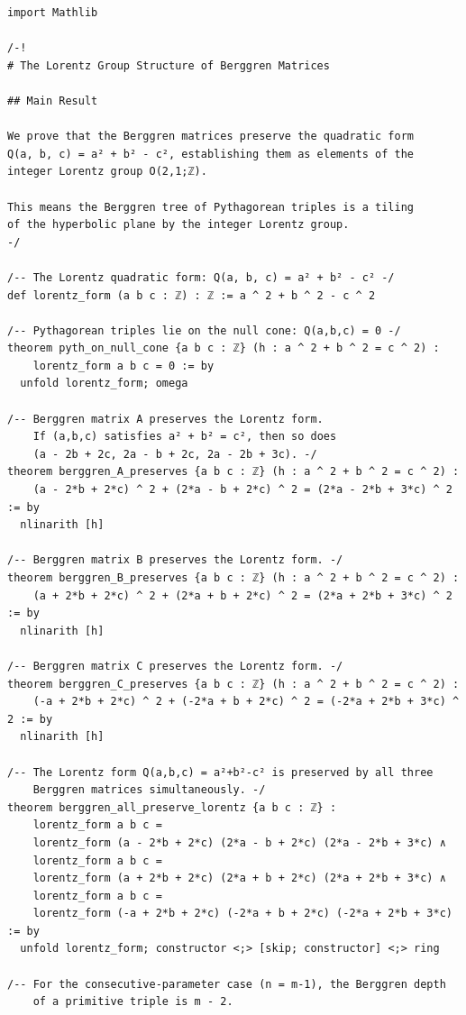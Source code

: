\documentclass[11pt,openany]{book}
\theoremstyle{definition}
\theoremstyle{plain}
\theoremstyle{remark}
\begin{document}
\begin{lstlisting}[style=lean]
import Mathlib

/-!
# The Lorentz Group Structure of Berggren Matrices

## Main Result

We prove that the Berggren matrices preserve the quadratic form
Q(a, b, c) = a² + b² - c², establishing them as elements of the
integer Lorentz group O(2,1;ℤ).

This means the Berggren tree of Pythagorean triples is a tiling
of the hyperbolic plane by the integer Lorentz group.
-/

/-- The Lorentz quadratic form: Q(a, b, c) = a² + b² - c² -/
def lorentz_form (a b c : ℤ) : ℤ := a ^ 2 + b ^ 2 - c ^ 2

/-- Pythagorean triples lie on the null cone: Q(a,b,c) = 0 -/
theorem pyth_on_null_cone {a b c : ℤ} (h : a ^ 2 + b ^ 2 = c ^ 2) :
    lorentz_form a b c = 0 := by
  unfold lorentz_form; omega

/-- Berggren matrix A preserves the Lorentz form.
    If (a,b,c) satisfies a² + b² = c², then so does
    (a - 2b + 2c, 2a - b + 2c, 2a - 2b + 3c). -/
theorem berggren_A_preserves {a b c : ℤ} (h : a ^ 2 + b ^ 2 = c ^ 2) :
    (a - 2*b + 2*c) ^ 2 + (2*a - b + 2*c) ^ 2 = (2*a - 2*b + 3*c) ^ 2 := by
  nlinarith [h]

/-- Berggren matrix B preserves the Lorentz form. -/
theorem berggren_B_preserves {a b c : ℤ} (h : a ^ 2 + b ^ 2 = c ^ 2) :
    (a + 2*b + 2*c) ^ 2 + (2*a + b + 2*c) ^ 2 = (2*a + 2*b + 3*c) ^ 2 := by
  nlinarith [h]

/-- Berggren matrix C preserves the Lorentz form. -/
theorem berggren_C_preserves {a b c : ℤ} (h : a ^ 2 + b ^ 2 = c ^ 2) :
    (-a + 2*b + 2*c) ^ 2 + (-2*a + b + 2*c) ^ 2 = (-2*a + 2*b + 3*c) ^ 2 := by
  nlinarith [h]

/-- The Lorentz form Q(a,b,c) = a²+b²-c² is preserved by all three
    Berggren matrices simultaneously. -/
theorem berggren_all_preserve_lorentz {a b c : ℤ} :
    lorentz_form a b c =
    lorentz_form (a - 2*b + 2*c) (2*a - b + 2*c) (2*a - 2*b + 3*c) ∧
    lorentz_form a b c =
    lorentz_form (a + 2*b + 2*c) (2*a + b + 2*c) (2*a + 2*b + 3*c) ∧
    lorentz_form a b c =
    lorentz_form (-a + 2*b + 2*c) (-2*a + b + 2*c) (-2*a + 2*b + 3*c) := by
  unfold lorentz_form; constructor <;> [skip; constructor] <;> ring

/-- For the consecutive-parameter case (n = m-1), the Berggren depth
    of a primitive triple is m - 2.


\end{lstlisting}
\end{document}
